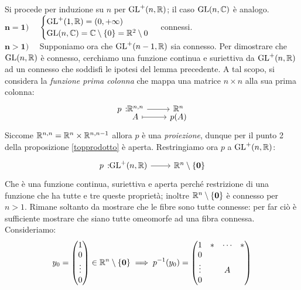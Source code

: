 \begin{demonstration}
	Si procede per induzione su $n$ per $\operatorname{GL}^+(n,\mathbb{R})$; il caso $\operatorname{GL}(n,\mathbb{C})$ è analogo.\\
	$\mathbf{n=1)}$ \ \ $\begin{cases}
			\operatorname{GL}^+(1,\mathbb{R})=(0,+\infty) \\
			\operatorname{GL}(n,\mathbb{C})=\mathbb{C}\setminus\{0\}=\mathbb{R}^2\setminus{0}
		\end{cases}$ connessi.\\
	$\mathbf{n>1)}$ \ \ Supponiamo ora che $\operatorname{GL}^+(n-1,\mathbb{R})$ sia connesso. Per dimostrare che $\operatorname{GL}(n,\mathbb{R})$ è connesso, cerchiamo una funzione continua e suriettiva da $\operatorname{GL}^+(n,\mathbb{R})$ ad un connesso che soddisfi le ipotesi del lemma precedente. A tal scopo, si considera la \textit{funzione prima colonna} che mappa una matrice $n\times n$ alla sua prima colonna:
	\begin{equation*}
		\funztot p {\realset^{n,n}} {\realset^n} A {p(A)}
	\end{equation*}
	Siccome $\mathbb{R}^{n,n}=\mathbb{R}^n\times\mathbb{R}^{n,n-1}$ allora $p$ è una \textit{proiezione}, dunque per il punto 2 della proposizione \ref{topprodotto} è aperta. Restringiamo ora $p$ a $\operatorname{GL}^+(n,\mathbb{R})$:
	\begin{equation*}
		\funz p {\gl^+(n,\realset)} {\realset^n\setminus\{\mathbf{0}\}}
	\end{equation*}
	Che è una funzione continua, suriettiva e aperta perché restrizione di una funzione che ha tutte e tre queste proprietà; inoltre $\mathbb{R}^n\setminus\{\mathbf{0}\}$ è connesso per $n>1$. Rimane soltanto da mostrare che le fibre sono tutte connesse: per far ciò è sufficiente mostrare che siano tutte omeomorfe ad una fibra connessa. Consideriamo:
		\begin{gather*}
			y_0=\begin{pmatrix}
					1 \\ 0 \\ \vdots \\ 0
				\end{pmatrix}\in \mathbb{R}^n\setminus\{\mathbf{0}\} \implies p^{-1}	(y_0)=\begin{pmatrix}
						1      & * & \cdots & *\\
						0      &   &       &  \\
						\vdots &   & A     &  \\
						0      &   &       &
					\end{pmatrix}
		\end{gather*}

\end{demonstration}
